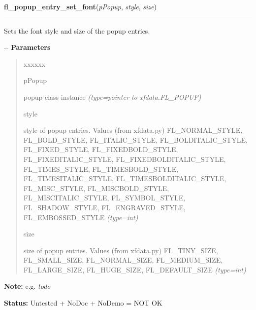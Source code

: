     \vspace{0.5ex}

\hspace{.8\funcindent}\begin{boxedminipage}{\funcwidth}

    \raggedright \textbf{fl\_popup\_entry\_set\_font}(\textit{pPopup}, \textit{style}, \textit{size})

    \vspace{-1.5ex}

    \rule{\textwidth}{0.5\fboxrule}
\setlength{\parskip}{2ex}

Sets the font style and size of the popup entries.

-{}-
\setlength{\parskip}{1ex}
      \textbf{Parameters}
      \vspace{-1ex}

      \begin{quote}
        \begin{Ventry}{xxxxxx}

          \item[pPopup]


popup class instance
            {\it (type=pointer to xfdata.FL\_POPUP)}

          \item[style]


style of popup entries. Values (from xfdata.py) FL\_NORMAL\_STYLE,
FL\_BOLD\_STYLE, FL\_ITALIC\_STYLE, FL\_BOLDITALIC\_STYLE, FL\_FIXED\_STYLE,
FL\_FIXEDBOLD\_STYLE, FL\_FIXEDITALIC\_STYLE, FL\_FIXEDBOLDITALIC\_STYLE,
FL\_TIMES\_STYLE, FL\_TIMESBOLD\_STYLE, FL\_TIMESITALIC\_STYLE,
FL\_TIMESBOLDITALIC\_STYLE, FL\_MISC\_STYLE, FL\_MISCBOLD\_STYLE,
FL\_MISCITALIC\_STYLE, FL\_SYMBOL\_STYLE, FL\_SHADOW\_STYLE,
FL\_ENGRAVED\_STYLE, FL\_EMBOSSED\_STYLE
            {\it (type=int)}

          \item[size]


size of popup entries. Values (from xfdata.py) FL\_TINY\_SIZE,
FL\_SMALL\_SIZE, FL\_NORMAL\_SIZE, FL\_MEDIUM\_SIZE, FL\_LARGE\_SIZE,
FL\_HUGE\_SIZE, FL\_DEFAULT\_SIZE
            {\it (type=int)}

        \end{Ventry}

      \end{quote}

\textbf{Note:} 
e.g. \emph{todo}


\textbf{Status:} 
Untested + NoDoc + NoDemo = NOT OK


    \end{boxedminipage}


